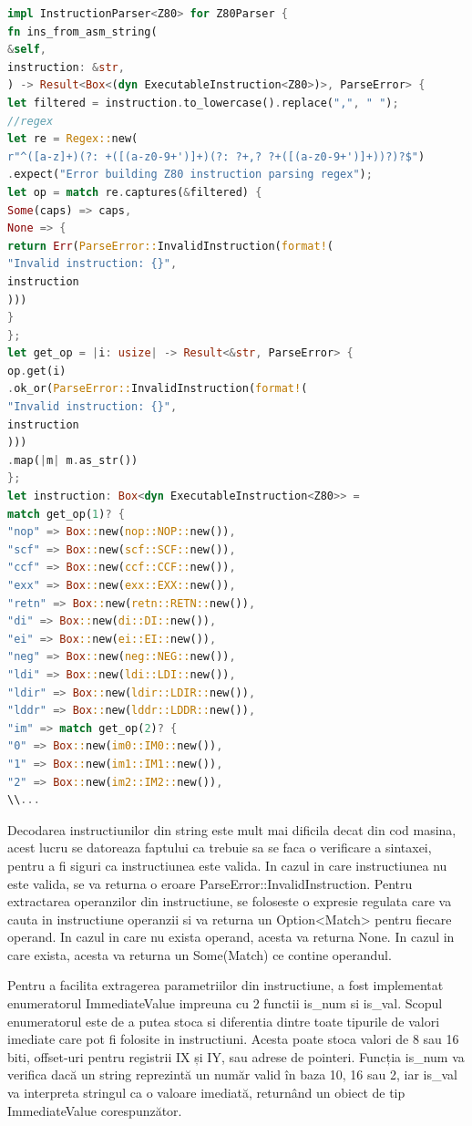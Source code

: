 \documentclass[titlepage,12pt]{article}
\DeclareRobustCommand{\code}[1]{{\ttfamily\small #1}}
\begin{document}
\begin{lstlisting}[language=Rust,caption={Sectiune decodor din string},label={lst:decoder-string}]
impl InstructionParser<Z80> for Z80Parser {
fn ins_from_asm_string(
&self,
instruction: &str,
) -> Result<Box<(dyn ExecutableInstruction<Z80>)>, ParseError> {
let filtered = instruction.to_lowercase().replace(",", " ");
//regex
let re = Regex::new(
r"^([a-z]+)(?: +([(a-z0-9+')]+)(?: ?+,? ?+([(a-z0-9+')]+))?)?$")
.expect("Error building Z80 instruction parsing regex");
let op = match re.captures(&filtered) {
Some(caps) => caps,
None => {
return Err(ParseError::InvalidInstruction(format!(
"Invalid instruction: {}",
instruction
)))
}
};
let get_op = |i: usize| -> Result<&str, ParseError> {
op.get(i)
.ok_or(ParseError::InvalidInstruction(format!(
"Invalid instruction: {}",
instruction
)))
.map(|m| m.as_str())
};
let instruction: Box<dyn ExecutableInstruction<Z80>> =
match get_op(1)? {
"nop" => Box::new(nop::NOP::new()),
"scf" => Box::new(scf::SCF::new()),
"ccf" => Box::new(ccf::CCF::new()),
"exx" => Box::new(exx::EXX::new()),
"retn" => Box::new(retn::RETN::new()),
"di" => Box::new(di::DI::new()),
"ei" => Box::new(ei::EI::new()),
"neg" => Box::new(neg::NEG::new()),
"ldi" => Box::new(ldi::LDI::new()),
"ldir" => Box::new(ldir::LDIR::new()),
"lddr" => Box::new(lddr::LDDR::new()),
"im" => match get_op(2)? {
"0" => Box::new(im0::IM0::new()),
"1" => Box::new(im1::IM1::new()),
"2" => Box::new(im2::IM2::new()),
\\...
\end{lstlisting}

Decodarea instructiunilor din string este mult mai dificila decat din cod masina, acest lucru se datoreaza faptului ca trebuie sa se faca o verificare a sintaxei, pentru a fi siguri ca instructiunea este valida. In cazul in care instructiunea nu este valida, se va returna o eroare \code{ParseError::InvalidInstruction}.
Pentru extractarea operanzilor din instructiune, se foloseste o expresie regulata care va cauta in instructiune operanzii si va returna un \code{Option<Match>} pentru fiecare operand. In cazul in care nu exista operand, acesta va returna \code{None}. In cazul in care exista, acesta va returna un \code{Some(Match)} ce contine operandul.

Pentru a facilita extragerea parametriilor din instructiune, a fost implementat enumeratorul \code{ImmediateValue} impreuna cu 2 functii \code{is\_num} si \code{is\_val}. Scopul enumeratorul este de a putea stoca si diferentia dintre toate tipurile de valori imediate care pot fi folosite in instructiuni. Acesta poate stoca valori de 8 sau 16 biti, offset-uri pentru registrii IX și IY, sau adrese de pointeri. Funcția \code{is\_num} va verifica dacă un string reprezintă un număr valid în baza 10, 16 sau 2, iar \code{is\_val} va interpreta stringul ca o valoare imediată, returnând un obiect de tip \code{ImmediateValue} corespunzător.
\end{document}
